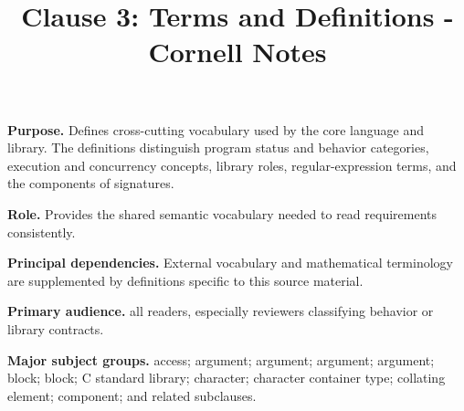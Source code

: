 \documentclass[11pt,letterpaper]{article}
\title{Clause 3: Terms and Definitions - Cornell Notes}
\author{}
\date{}
\begin{document}
\maketitle
\begin{CornellReferenceOrientationBox}
\textbf{Purpose.} Defines cross-cutting vocabulary used by the core language and library. The definitions distinguish program status and behavior categories, execution and concurrency concepts, library roles, regular-expression terms, and the components of signatures.
\par\textbf{Role.} Provides the shared semantic vocabulary needed to read requirements consistently.
\par\textbf{Principal dependencies.} External vocabulary and mathematical terminology are supplemented by definitions specific to this source material.
\par\textbf{Primary audience.} all readers, especially reviewers classifying behavior or library contracts.
\par\textbf{Major subject groups.} access; argument; argument; argument; argument; block; block; C standard library; character; character container type; collating element; component; and related subclauses.
\end{CornellReferenceOrientationBox}
\end{document}
